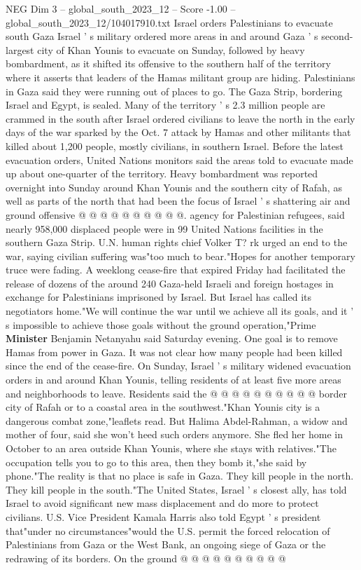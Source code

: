 \begin{textsample}{NEG Dim 3 – global\_south\_2023\_12 – Score -1.00 – global\_south\_2023\_12/104017910.txt}  \label{ex:f3_neg_037}
Israel orders Palestinians to evacuate south Gaza Israel ' s military ordered more areas in and around Gaza ' s second-largest city of Khan Younis to evacuate on Sunday, followed by heavy bombardment, as it shifted its offensive to the southern half of the territory where it asserts that leaders of the Hamas militant group are hiding.
Palestinians in Gaza said they were running out of places to go.
The Gaza Strip, bordering Israel and Egypt, is sealed.
Many of the territory ' s 2.3 million people are crammed in the south after Israel ordered civilians to leave the north in the early days of the war sparked by the Oct. 7 attack by Hamas and other militants that killed about 1,200 people, mostly civilians, in southern Israel.
Before the latest evacuation orders, United Nations monitors said the areas told to evacuate made up about one-quarter of the territory.
Heavy bombardment was reported overnight into Sunday around Khan Younis and the southern city of Rafah, as well as parts of the north that had been the focus of Israel ' s shattering air and ground offensive @ @ @ @ @ @ @ @ @ @. agency for Palestinian refugees, said nearly 958,000 displaced people were in 99 United Nations facilities in the southern Gaza Strip.
U.N. human rights chief Volker T? rk urged an end to the war, saying civilian suffering was"too much to bear."Hopes for another temporary truce were fading.
A weeklong cease-fire that expired Friday had facilitated the release of dozens of the around 240 Gaza-held Israeli and foreign hostages in exchange for Palestinians imprisoned by Israel.
But Israel has called its negotiators home."We will continue the war until we achieve all its goals, and it ' s impossible to achieve those goals without the ground operation,"Prime \textbf{Minister} Benjamin Netanyahu said Saturday evening.
One goal is to remove Hamas from power in Gaza.
It was not clear how many people had been killed since the end of the cease-fire.
On Sunday, Israel ' s military widened evacuation orders in and around Khan Younis, telling residents of at least five more areas and neighborhoods to leave.
Residents said the @ @ @ @ @ @ @ @ @ @ border city of Rafah or to a coastal area in the southwest."Khan Younis city is a dangerous combat zone,"leaflets read.
But Halima Abdel-Rahman, a widow and mother of four, said she won't heed such orders anymore.
She fled her home in October to an area outside Khan Younis, where she stays with relatives."The occupation tells you to go to this area, then they bomb it,"she said by phone."The reality is that no place is safe in Gaza.
They kill people in the north.
They kill people in the south."The United States, Israel ' s closest ally, has told Israel to avoid significant new mass displacement and do more to protect civilians.
U.S.
Vice President Kamala Harris also told Egypt ' s president that"under no circumstances"would the U.S. permit the forced relocation of Palestinians from Gaza or the West Bank, an ongoing siege of Gaza or the redrawing of its borders.
On the ground @ @ @ @ @ @ @ @ @ @

\end{textsample}
